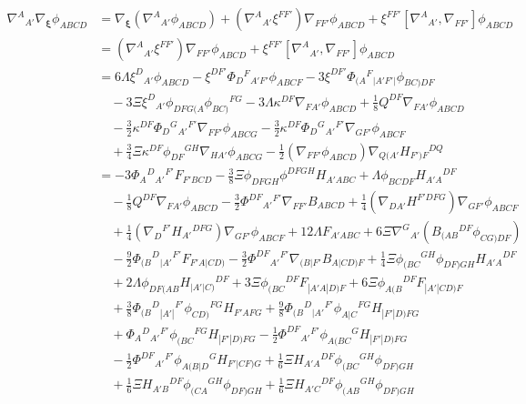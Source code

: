 \documentclass[10pt,a4paper]{article}
\theoremstyle{plain}
\begin{document}
\begin{align}
    \nabla^A{}_{A'}\nabla_{\bm\xi}\phi_{ABCD} &=  \nabla_{\bm\xi}(\nabla^A{}_{A'}\phi_{ABCD}) + (\nabla^A{}_{A'}\xi^{FF'})\nabla_{FF'} \phi_{ABCD} + \xi^{FF'}\left[\nabla^A{}_{A'}, \nabla_{FF'}\right]\phi_{ABCD}\nonumber\\
    & = (\nabla^A{}_{A'}\xi^{FF'})\nabla_{FF'} \phi_{ABCD} + \xi^{FF'}\left[\nabla^A{}_{A'}, \nabla_{FF'}\right]\phi_{ABCD}\nonumber\\
    & = 6 \Lambda \xi^{D}{}_{A'} \phi_{ABCD} -  \xi^{DF'} \Phi_{D}{}^{F}{}_{A'F'} \phi_{ABCF} -  3\xi^{DF'} \Phi_{(A}{}^{F}{}_{\vert A'F'\vert} \phi_{BC)DF}  \nonumber\\
    &\quad -  3\Xi\xi^{D}{}_{A'}  \phi_{DFG(A} \phi_{BC)}{}^{FG} - 3\Lambda \kappa^{DF} \nabla_{FA'}\phi_{ABCD} + \tfrac{1}{8} Q^{DF} \nabla_{FA'}\phi_{ABCD}  \nonumber\\ 
    &\quad -  \tfrac{3}{2} \kappa^{DF} \Phi_{D}{}^{G}{}_{A'}{}^{F'} \nabla_{FF'}\phi_{ABCG} -  \tfrac{3}{2} \kappa^{DF} \Phi_{D}{}^{G}{}_{A'}{}^{F'} \nabla_{GF'}\phi_{ABCF} \nonumber\\
    &\quad + \tfrac{3}{4} \Xi \kappa^{DF} \phi_{DF}{}^{GH} \nabla_{HA'}\phi_{ABCG} - \tfrac{1}{2}( \nabla_{FF'}\phi_{ABCD}) \nabla_{Q(A'}H_{F')F}{}^{DQ}\nonumber\\
    &= -3 \Phi _{A}{}^{D}{}_{A'}{}^{F'} F_{F'BCD}  - \tfrac{3}{8} \Xi  \phi _{DFGH} \phi ^{DFGH} H_{A'ABC} + \Lambda  \phi _{BCDF} H_{A'A}{}^{DF} \nonumber\\ 
    & \quad- \tfrac{1}{8} Q^{DF} \nabla_{FA'}\phi _{ABCD}   - \tfrac{3}{2} \Phi ^{DF}{}_{A'}{}^{F'} \nabla_{FF'}B_{ABCD} + \tfrac{1}{4} (\nabla_{DA'}H^{F'DFG}) \nabla_{GF'}\phi _{ABCF} \nonumber\\
    &\quad + \tfrac{1}{4} (\nabla_{D}{}^{F'}H_{A'}{}^{DFG}) \nabla_{GF'}\phi _{ABCF}  + 12 \Lambda  F_{A'ABC} +6\Xi \nabla^G{}_{A'}\left( B_{(AB}{}^{DF}\phi_{CG)DF}\right) \nonumber \\
    &\quad - \tfrac{9}{2} \Phi _{(B}{}^{D}{}_{|A'}{}^{F'}F_{F'A|CD)}  - \tfrac{3}{2} \Phi ^{DF}{}_{A'}{}^{F'}\nabla_{(B|F'}B_{A|CD)F} + \tfrac{1}{4} \Xi  \phi _{(BC}{}^{GH}\phi _{DF)GH} H_{A'A}{}^{DF}  \nonumber\\
    &\quad+ 2 \Lambda  \phi_{DF(AB}H_{\vert A'\vert C)}{}^{DF}+ 3 \Xi  \phi _{(BC}{}^{DF}F_{|A'A|D)F} + 6 \Xi  \phi _{A(B}{}^{DF}F_{|A'|CD)F} \nonumber \\
    &\quad  + \tfrac{3}{8} \Phi _{(B}{}^{D}{}_{|A'|}{}^{F'}\phi _{CD)}{}^{FG}H_{F'AFG} + \tfrac{9}{8} \Phi _{(B}{}^{D}{}_{|A'}{}^{F'}\phi _{A|C}{}^{FG}H_{|F'|D)FG} \nonumber\\
    &\quad + \Phi _{A}{}^{D}{}_{A'}{}^{F'}\phi _{(BC}{}^{FG}H_{|F'|D)FG}  - \tfrac{1}{2} \Phi ^{DF}{}_{A'}{}^{F'}\phi _{A(BC}{}^{G}H_{|F'|D)FG} \nonumber \\
    &\quad  - \tfrac{1}{2} \Phi ^{DF}{}_{A'}{}^{F'}\phi _{A(B|D}{}^{G}H_{F'|CF)G}+ \tfrac{1}{6}\Xi H_{A'A}{}^{DF}\phi_{(BC}{}^{GH}\phi_{DF)GH} \nonumber\\
    &\quad + \tfrac{1}{6}\Xi H_{A'B}{}^{DF}\phi_{(CA}{}^{GH}\phi_{DF)GH} + \tfrac{1}{6}\Xi H_{A'C}{}^{DF}\phi_{(AB}{}^{GH}\phi_{DF)GH} \label{Eq:CollineationIdentity}
\end{align}
\end{document}
